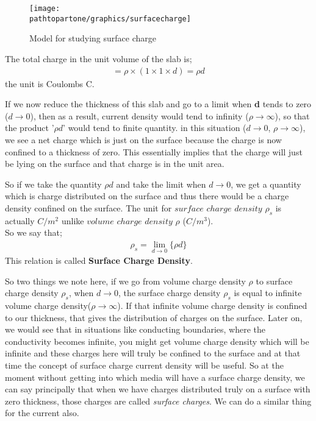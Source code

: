 \begin{figure}[h]
	\centering
	\texttt{[image: \\pathtopartone/graphics/surfacecharge]}
	\caption{Model for studying surface charge}
	\label{fig:surfacecharge}
\end{figure} 

The total charge in the unit volume of the slab is;
\begin{align*}
	=\rho\times(1\times 1\times d)=\rho d
\end{align*}
the unit is Coulombs C.

If we now reduce the thickness of this slab and go to a limit when \textbf{d} tends to zero ($d\rightarrow 0$), then as a result, current density would tend to infinity ($\rho\rightarrow\infty$), so that the product '$\rho d$' would tend to finite quantity. in this situation ($d\rightarrow 0$, $\rho\rightarrow\infty$), we see a net charge which is just on the surface because the charge is now confined to a thickness of zero. This essentially implies that the charge will just be lying on the surface and that charge is in the unit area. 


So if we take the quantity $\rho d$ and take the limit when $d\rightarrow0$, we get a quantity which is charge distributed on the surface and thus there would be a charge density confined on the surface. The unit for $surface$ $charge$ $density$ $\rho_{s}$ is actually $C/m^{2}$ unlike $volume$ $charge$ $density$ $\rho$ ($C/m^{3}$).\\
So we say that;
\begin{align}
	\rho_{s}=\lim_{d\rightarrow0}\{\rho d\} 
\end{align}
This relation is called \textbf{Surface Charge Density}.

So two things we note here, if we go from volume charge density $\rho$ to surface charge density $\rho_{s}$, when $d\rightarrow0$, the surface charge density $\rho_{s}$ is equal to infinite volume charge density($\rho\rightarrow\infty$). If that infinite volume charge density is confined to our thickness, that gives the distribution of charges on the surface. Later on, we would see that in situations like conducting boundaries, where the conductivity becomes infinite, you might get volume charge density which will be infinite and these charges here will truly be confined to the surface and at that time the concept of surface charge current density will be useful. So at the moment without getting into which media will have a surface charge density, we can say principally that when we have charges distributed truly on a surface with zero thickness, those charges are called \textit{surface charges}. We can do a similar thing for the current also.

